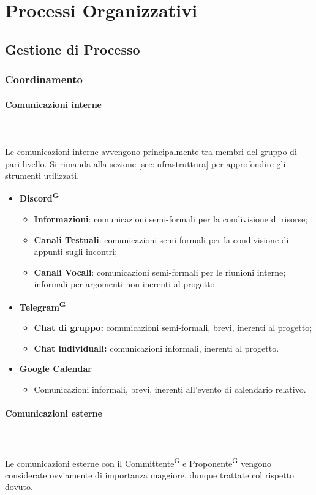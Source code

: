 \documentclass[8pt]{article}
\newcommand{\glossterm}[1]{#1\textsuperscript{G}} %
\newcommand{\subsubsubsection}[1]{\paragraph{#1}\mbox{}\\}
\begin{document}
\section{Processi Organizzativi} \label{sec:processi_organizzativi}
\subsection{Gestione di Processo}
\subsubsection{Coordinamento} \label{sec:coordinamento}
\subsubsubsection{Comunicazioni interne}\\
Le comunicazioni interne avvengono principalmente tra membri del gruppo di pari livello. Si rimanda alla sezione \hypersetup{hidelinks}\ref{sec:infrastruttura} per approfondire gli strumenti utilizzati.
\begin{itemize}
  \item{\textbf{\glossterm{Discord}}}
  \begin{itemize}
    \item \textbf{Informazioni}: comunicazioni semi-formali per la condivisione di risorse;
    \item \textbf{Canali Testuali}: comunicazioni semi-formali per la condivisione di appunti sugli
        incontri;
    \item \textbf{Canali Vocali}: comunicazioni semi-formali per le riunioni interne; informali per argomenti non inerenti al progetto.
  \end{itemize}
  \item{\textbf{\glossterm{Telegram}}}
  \begin{itemize}
    \item \textbf{Chat di gruppo:} comunicazioni semi-formali, brevi, inerenti al progetto;
    \item \textbf{Chat individuali:} comunicazioni informali, inerenti al progetto.
  \end{itemize}
  \item{\textbf{Google Calendar}}
  \begin{itemize}
    \item{Comunicazioni informali, brevi, inerenti all'evento di calendario relativo.}
  \end{itemize}
\end{itemize}
\subsubsubsection{Comunicazioni esterne}\\
Le comunicazioni esterne con il \glossterm{Committente} e \glossterm{Proponente} vengono considerate ovviamente di importanza maggiore, dunque trattate col rispetto dovuto.\\
\end{document}
